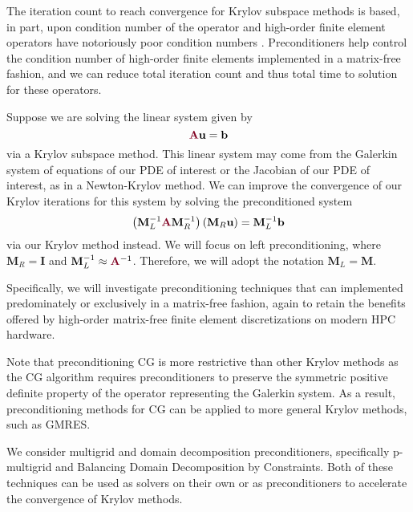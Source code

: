 The iteration count to reach convergence for Krylov subspace methods is based, in part, upon condition number of the operator \cite{luenberger1973introduction} and high-order finite element operators have notoriously poor condition numbers \cite{hu1998bounds}.
Preconditioners help control the condition number of high-order finite elements implemented in a matrix-free fashion, and we can reduce total iteration count and thus total time to solution for these operators.

Suppose we are solving the linear system given by
\begin{equation}
{\color{burgundy}\mathbf{A}} \mathbf{u} = \mathbf{b}
\label{linear_eqn}
\end{equation}
via a Krylov subspace method.
This linear system may come from the Galerkin system of equations of our PDE of interest or the Jacobian of our PDE of interest, as in a Newton-Krylov method.
We can improve the convergence of our Krylov iterations for this system by solving the preconditioned system
\begin{equation}
\left( \mathbf{M}_L^{-1} {\color{burgundy}\mathbf{A}} \mathbf{M}_R^{-1} \right) \left( \mathbf{M}_R \mathbf{u} \right) = \mathbf{M}_L^{-1} \mathbf{b}
\label{precond_eqn}
\end{equation}
via our Krylov method instead.
We will focus on left preconditioning, where $\mathbf{M}_R = \mathbf{I}$ and $\mathbf{M}_L^{-1} \approx {\color{burgundy}\mathbf{A}}^{-1}$.
Therefore, we will adopt the notation $\mathbf{M}_L = \mathbf{M}$.

Specifically, we will investigate preconditioning techniques that can implemented predominately or exclusively in a matrix-free fashion, again to retain the benefits offered by high-order matrix-free finite element discretizations on modern HPC hardware.

Note that preconditioning CG is more restrictive than other Krylov methods as the CG algorithm requires preconditioners to preserve the symmetric positive definite property of the operator representing the Galerkin system.
As a result, preconditioning methods for CG can be applied to more general Krylov methods, such as GMRES.

We consider multigrid and domain decomposition preconditioners, specifically p-multigrid and Balancing Domain Decomposition by Constraints.
Both of these techniques can be used as solvers on their own or as preconditioners to accelerate the convergence of Krylov methods.
